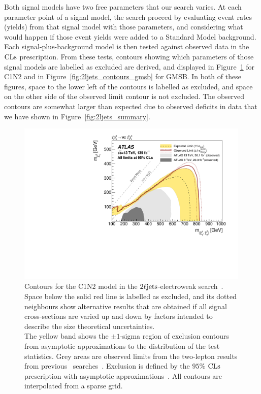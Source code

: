 Both signal models have two free parameters that our search varies.
At each parameter point of a signal model, the search proceed by evaluating
event rates (yields) from that signal model with those parameters,
and considering what would happen if those event yields were added to a
Standard Model background.
Each signal-plus-background model is then tested against observed data in the
$\mathrm{CLs}$ prescription.
From these tests, contours showing which parameters of those signal models are
labelled as excluded are derived, and displayed in
Figure~\ref{fig:2ljets_contours_c1n2} for C1N2 and in
Figure~\ref{fig:2ljets_contours_gmsb} for GMSB.
In both of these figures, space to the lower left of the contours is
labelled as excluded, and space on the other side of the observed limit contour
is not excluded.
The observed contours are somewhat larger than expected due to observed
deficits in data that we have shown in Figure~\ref{fig:2ljets_summary}.

\begin{figure}[tp]
\centering
\includegraphics[width=0.99\textwidth]{figures/2ljets_contours_c1n2.pdf}
\caption[
Contours for the C1N2 model in the $\twoljets$-electroweak search
]{%
Contours for the C1N2 model in the $\twoljets$-electroweak
search~\cite{atlas2022searches}.
\\[0.5em]
Space below the solid red line is labelled as excluded, and its dotted
neighbours show alternative results that are obtained if all signal
cross-sections are varied up and down by factors intended to describe the size
theoretical uncertainties.
\\[0.5em]
The yellow band shows the $\pm1$-sigma region of exclusion contours
from asymptotic approximations to the distribution of the test statistics.
Grey areas are observed limits from the two-lepton results from previous
\atlas\ searches~\cite{atlas_23l_SUSY_2016_24, atlas_2l_SUSY_2013_11}.
Exclusion is defined by the $95\%$ $\mathrm{CLs}$ prescription
with asymptotic approximations~\cite{Cowan:2010js}.
All contours are interpolated from a sparse grid.
}
\label{fig:2ljets_contours_c1n2}
\end{figure}

